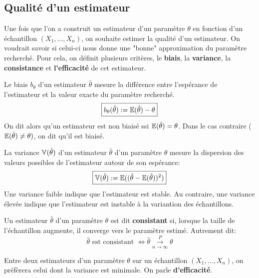 \subsection{Qualité d'un estimateur}

Une fois que l'on a construit un estimateur d'un paramètre $\theta$ en fonction d'un échantillon 
$(X_1, \dots, X_n)$, on souhaite estimer la qualité d'un estimateur. On voudrait savoir si celui-ci nous donne 
une "bonne" approximation du paramètre recherché. 
Pour cela, on définit plusieurs critères, le \textbf{biais}, la \textbf{variance}, la \textbf{consistance} et \textbf{l'efficacité} 
de cet estimateur. 

\newpage 

\begin{definition}
    Le biais $b_\theta$ d'un estimateur $\hat{\theta}$ mesure la différence entre l'espérance de l'estimateur 
    et la valeur exacte du paramètre recherché. 
        \[ \boxed{ b_\theta(\hat{\theta}) := \mathbb{E}(\hat{\theta}) - \theta } \] 
    On dit alors qu'un estimateur est non biaisé ssi $ \mathbb{E}(\hat{\theta}) = \theta$. 
    Dans le cas contraire ($\mathbb{E}(\hat{\theta}) \not = \theta)$, on dit qu'il est biaisé. 
\end{definition}

\begin{definition}
    La variance $\mathbb{V}(\hat{\theta})$ d'un estimateur $\hat{\theta}$ d'un paramètre $\theta$ mesure la dispersion 
    des valeurs possibles de l'estimateur autour de son espérance: 
        \[ \boxed{
            \mathbb{V}(\hat{\theta}) := \mathbb{E}((\hat{\theta} - \mathbb{E}(\hat{\theta}) )^2) 
        } \] 
    Une variance faible indique que l'estimateur est stable. Au contraire, une variance élevée indique que l'estimateur est 
    instable à la variantion des échantillons. 
\end{definition}

\begin{definition}[Consistance]
    Un estimateur $\hat{\theta}$ d'un paramètre $\theta$ est dit \textbf{consistant} si, lorsque la taille de l'échantillon 
    augmente, il converge vers le paramètre estimé. Autrement dit: 
        \[ \hat{\theta} \text{ est consistant } \iff \hat{\theta} \overset{P}{\underset{n \to \infty}{\longrightarrow}} \theta \] 
\end{definition}

\begin{proposition}
    Entre deux estimateurs d'un paramètre $\theta$ sur un échantillon $(X_1, \dots, X_n)$, on préfèrera 
    celui dont la variance est minimale. On parle \textbf{d'efficacité}. 
\end{proposition}

